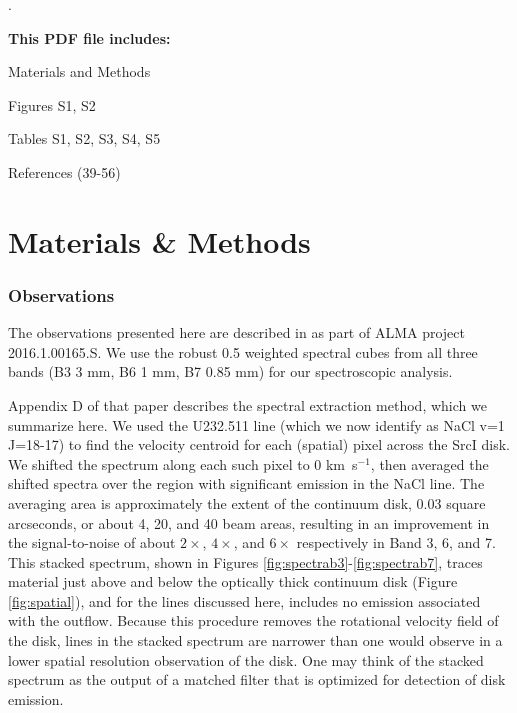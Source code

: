 \documentclass[12pt]{article}
\newcounter{lastnote}
\newenvironment{scilastnote}{%
\setcounter{lastnote}{\value{enumiv}}%
\addtocounter{lastnote}{+1}%
\begin{list}%
{\arabic{lastnote}.}
{\setlength{\leftmargin}{.22in}}
{\setlength{\labelsep}{.5em}}}
{\end{list}}
\newcommand{\sourcei}{SrcI\xspace}
\newcommand{\kms}{\textrm{km~s}\ensuremath{^{-1}}\xspace}	%
\begin{document}
\begin{scilastnote}
\item[] \textbf{This PDF file includes:}


\vspace{-1em}
Materials and Methods

\vspace{-1em}
Figures S1, S2

\vspace{-1em}
Tables S1, S2, S3, S4, S5

\vspace{-1em}
References (39-56)

 \end{scilastnote}
 
 \clearpage
 
 \part*{Materials \& Methods}

\renewcommand{\thefigure}{S\arabic{figure}}
\renewcommand{\thetable}{S\arabic{table}}
\renewcommand{\theequation}{S\arabic{equation}}
\setcounter{figure}{0}
\setcounter{table}{0}
\setcounter{equation}{0}


\section*{Observations}

The observations presented here are described in \cite{Ginsburg2018b} as part
of ALMA project 2016.1.00165.S.  We use the robust 0.5 weighted spectral cubes
from all three bands (B3 3 mm, B6 1 mm, B7 0.85 mm) for our spectroscopic analysis.

Appendix D of that paper describes the spectral extraction method,
which we summarize here.  We used the U232.511 line (which we now identify as
NaCl v=1 J=18-17) to find the velocity centroid for each (spatial) pixel
across the \sourcei disk.  We shifted the spectrum along
each such pixel to 0 \kms, then averaged the shifted spectra over the region with
significant emission in the NaCl line.  
The
averaging area is approximately the extent of the continuum disk, 0.03 square
arcseconds, or about 4, 20, and 40  beam areas, resulting
in an improvement in the signal-to-noise of about $2\times$, $4\times$, and $6\times$
respectively in Band 3, 6, and 7.
This stacked spectrum, shown in Figures \ref{fig:spectrab3}-\ref{fig:spectrab7},
traces material just above and below the optically thick continuum disk
(Figure \ref{fig:spatial}), and for the lines discussed here, includes no
emission associated with the outflow.  
Because this procedure removes the rotational velocity field of the disk,
lines in the stacked spectrum are narrower than one would observe in
a lower spatial resolution observation of the disk.  One may think of the
stacked spectrum as the output of a matched filter that is optimized for
detection of disk emission.
\end{document}
